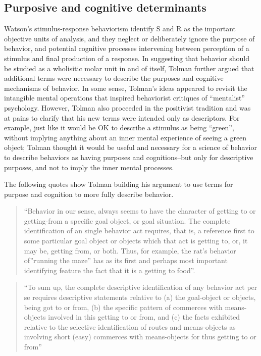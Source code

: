 \documentclass[
  oneside,
  12pt]{crumpbook}
\begin{document}
\hypertarget{purposive-and-cognitive-determinants}{%
\subsection{Purposive and cognitive determinants}\label{purposive-and-cognitive-determinants}}

Watson's stimulus-response behaviorism identify S and R as the important objective units of analysis, and they neglect or deliberately ignore the purpose of behavior, and potential cognitive processes intervening between perception of a stimulus and final production of a response. In suggesting that behavior should be studied as a wholisitic molar unit in and of itself, Tolman further argued that additional terms were necessary to describe the purposes and cognitive mechanisms of behavior. In some sense, Tolman's ideas appeared to revisit the intangible mental operations that inspired behaviorist critiques of ``mentalist'' psychology. However, Tolman also proceeded in the positivist tradition and was at pains to clarify that his new terms were intended only as descriptors. For example, just like it would be OK to describe a stimulus as being ``green'', without implying anything about an inner mental experience of seeing a green object; Tolman thought it would be useful and necessary for a science of behavior to describe behaviors as having purposes and cognitions--but only for descriptive purposes, and not to imply the inner mental processes.

The following quotes show Tolman building his argument to use terms for purpose and cognition to more fully describe behavior.

\begin{quote}
``Behavior in our sense, always seems to have the character of getting to or getting-from a specific goal object, or goal situation. The complete identification of an single behavior act requires, that is, a reference first to some particular goal object or objects which that act is getting to, or, it may be, getting from, or both. Thus, for example, the rat's behavior of''running the maze'' has as its first and perhaps most important identifying feature the fact that it is a getting to food''.
\end{quote}

\begin{quote}
``To sum up, the complete descriptive identification of any behavior act per se requires descriptive statements relative to (a) the goal-object or objects, being got to or from, (b) the specific pattern of commerces with means-objects involved in this getting to or from, and (c) the facts exhibited relative to the selective identification of routes and means-objects as involving short (easy) commerces with means-objects for thus getting to or from''
\end{quote}
\end{document}

